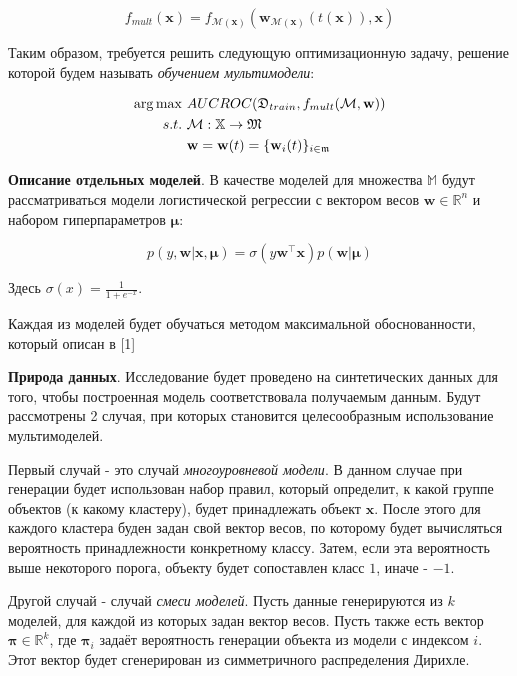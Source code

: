 \documentclass[12pt,twoside]{article}
\begin{document}
$$ f_{mult}(\mathbf{x}) = f_{\mathcal{M}(\mathbf{x})}(\mathbf{w}_{\mathcal{M}(\mathbf{x})}(t(\mathbf{x})), \mathbf{x}) $$

Таким образом, требуется решить следующую оптимизационную задачу, решение которой будем называть \emph{обучением мультимодели}:

\begin{align*}
\arg\max&\ AUC\-ROC(\mathfrak{D}_{train}, f_{mult}(\mathcal{M}, \mathbf{w})) \\
    s.t.&\ \mathcal{M}: \mathbb{X} \rightarrow \mathfrak{M} \\
        &\ \mathbf{w} = \mathbf{w}(t) = \{\mathbf{w}_i(t)\}_{i \in \mathfrak{m}}
\end{align*}

\textbf{Описание отдельных моделей}. В качестве моделей для множества $\mathbb{M}$ будут рассматриваться модели логистической регрессии с вектором весов $\mathbf{w} \in \mathbb{R}^n$ и набором гиперпараметров $\mathbf{\mu}$:

$$ p(y, \mathbf{w} | \mathbf{x}, \mathbf{\mu}) = \sigma(y\mathbf{w}^\top \mathbf{x})p(\mathbf{w} | \mathbf{\mu}) $$

Здесь $\sigma(x) = \frac{1}{1 + e^{-x}}$.

Каждая из моделей будет обучаться методом максимальной обоснованности, который описан в [1]

\bigskip
\textbf{Природа данных}. Исследование будет проведено на синтетических данных для того, чтобы построенная модель соответствовала получаемым данным. Будут рассмотрены 2 случая, при которых становится целесообразным использование мультимоделей.

Первый случай - это случай \emph{многоуровневой модели}. В данном случае при генерации будет использован набор правил, который определит, к какой группе объектов (к какому кластеру), будет принадлежать объект $\mathbf{x}$. После этого для каждого кластера буден задан свой вектор весов, по которому будет вычисляться вероятность принадлежности конкретному классу. Затем, если эта вероятность выше некоторого порога, объекту будет сопоставлен класс $1$, иначе - $-1$.

Другой случай - случай \emph{смеси моделей}. Пусть данные генерируются из $k$ моделей, для каждой из которых задан вектор весов. Пусть также есть вектор $\mathbf{\pi} \in \mathbb{R}^k$, где $\mathbf{\pi}_i$ задаёт вероятность генерации объекта из модели с индексом $i$. Этот вектор будет сгенерирован из симметричного распределения Дирихле.
\end{document}
